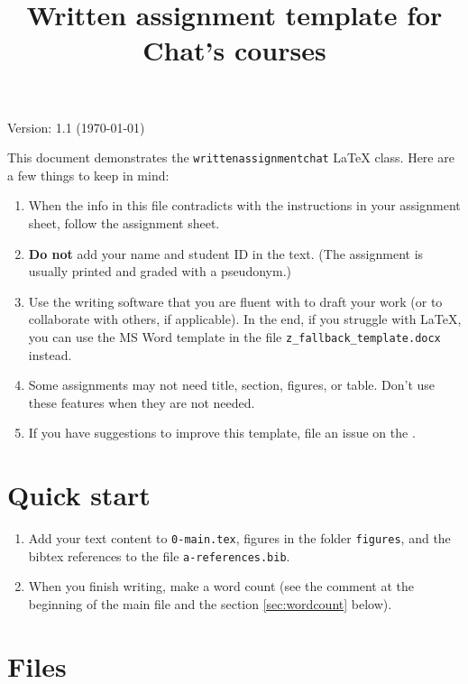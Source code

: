 \documentclass{writtenassignmentchat}
\title{Written assignment template for Chat's courses}
\begin{document}
\maketitle
\begin{flushleft}
Version: 1.1 (\today)

This document demonstrates the \texttt{writtenassignmentchat} \LaTeX{} class. Here are a few things to keep in mind:
\end{flushleft}

\begin{enumerate}
  \item When the info in this file contradicts with the instructions in your assignment sheet, follow the assignment sheet.
  \item \textbf{Do not} add your name and student ID in the text. (The assignment is usually printed and graded with a pseudonym.)
  \item Use the writing software that you are fluent with to draft your work (or to collaborate with others, if applicable). In the end, if you struggle with \LaTeX{}, you can use the MS Word template in the file \verb|z_fallback_template.docx| instead.
  \item Some assignments may not need title, section, figures, or table. Don't use these features when they are not needed.
  \item If you have suggestions to improve this template, file an issue on the  .
\end{enumerate}



\section{Quick start}

\begin{enumerate}
  \item Add your text content to \verb|0-main.tex|, figures in the folder \verb|figures|, and the bibtex references to the file \verb|a-references.bib|.
  \item When you finish writing, make a word count (see the comment at the beginning of the main file and the section \ref{sec:wordcount} below).
\end{enumerate}

\section{Files}
\end{document}

